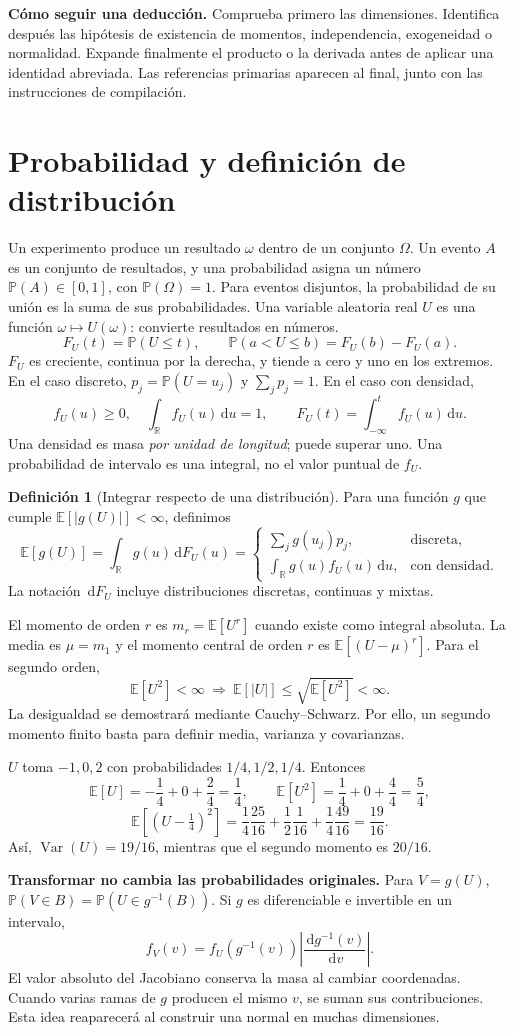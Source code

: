 \documentclass[11pt,a4paper]{article}
\newcommand{\R}{\mathbb R}
\newcommand{\E}{\mathbb E}
\newcommand{\Prob}{\mathbb P}
\newcommand{\dd}{\,\mathrm d}
\newcommand{\abs}[1]{\left\lvert #1\right\rvert}
\DeclareMathOperator{\Var}{Var}
\newcommand{\topic}[2]{\clearpage\section{#1}\label{#2}}
\theoremstyle{definition}\newtheorem{definicion}[teorema]{Definición}
\begin{document}
\textbf{Cómo seguir una deducción.} Comprueba primero las dimensiones.
Identifica después las hipótesis de existencia de momentos, independencia,
exogeneidad o normalidad. Expande finalmente el producto o la derivada antes
de aplicar una identidad abreviada. Las referencias primarias aparecen al
final, junto con las instrucciones de compilación.
\topic{Probabilidad y definición de distribución}{s01}
Un experimento produce un resultado $\omega$ dentro de un conjunto $\mathcal
\Omega$. Un evento $A$ es un conjunto de resultados, y una probabilidad
asigna un número $\Prob(A)\in[0,1]$, con $\Prob(\mathcal\Omega)=1$. Para eventos
disjuntos, la probabilidad de su unión es la suma de sus probabilidades.
Una variable aleatoria real $U$ es una función $\omega\mapsto U(\omega)$:
convierte resultados en números.
\[
F_U(t)=\Prob(U\le t),\qquad
\Prob(a<U\le b)=F_U(b)-F_U(a).
\]
$F_U$ es creciente, continua por la derecha, y tiende a cero y uno en los
extremos. En el caso discreto, $p_j=\Prob(U=u_j)$ y $\sum_jp_j=1$.
En el caso con densidad,
\[
f_U(u)\ge0,\quad\int_{\R}f_U(u)\dd u=1,\qquad
F_U(t)=\int_{-\infty}^t f_U(u)\dd u.
\]
Una densidad es masa \emph{por unidad de longitud}; puede superar uno. Una
probabilidad de intervalo es una integral, no el valor puntual de $f_U$.

\begin{definicion}[Integrar respecto de una distribución]
Para una función $g$ que cumple $\E[\abs{g(U)}]<\infty$, definimos
\[
\E[g(U)]=\int_{\R}g(u)\dd F_U(u)
=\begin{cases}
\sum_jg(u_j)p_j,&\text{discreta},\\
\int_{\R}g(u)f_U(u)\dd u,&\text{con densidad}.
\end{cases}
\]
La notación $\dd F_U$ incluye distribuciones discretas, continuas y mixtas.
\end{definicion}
El momento de orden $r$ es $m_r=\E[U^r]$ cuando existe como integral absoluta.
La media es $\mu=m_1$ y el momento central de orden $r$ es $\E[(U-\mu)^r]$.
Para el segundo orden,
\[
\E[U^2]<\infty\ \Longrightarrow\
\E[\abs U]\le\sqrt{\E[U^2]}<\infty.
\]
La desigualdad se demostrará mediante Cauchy--Schwarz. Por ello, un segundo
momento finito basta para definir media, varianza y covarianzas.

\begin{ejemplo}
$U$ toma $-1,0,2$ con probabilidades $1/4,1/2,1/4$. Entonces
\[
\E[U]=-\frac14+0+\frac24=\frac14,\qquad
\E[U^2]=\frac14+0+\frac44=\frac54,
\]
\[
\E[(U-\tfrac14)^2]
=\frac14\frac{25}{16}+\frac12\frac1{16}
+\frac14\frac{49}{16}=\frac{19}{16}.
\]
Así, $\Var(U)=19/16$, mientras que el segundo momento es $20/16$.
\end{ejemplo}
\textbf{Transformar no cambia las probabilidades originales.}
Para $V=g(U)$, $\Prob(V\in B)=\Prob(U\in g^{-1}(B))$.
Si $g$ es diferenciable e invertible en un intervalo,
\[
f_V(v)=f_U(g^{-1}(v))\abs{\frac{\dd g^{-1}(v)}{\dd v}}.
\]
El valor absoluto del Jacobiano conserva la masa al cambiar coordenadas.
Cuando varias ramas de $g$ producen el mismo $v$, se suman sus contribuciones.
Esta idea reaparecerá al construir una normal en muchas dimensiones.
\end{document}
